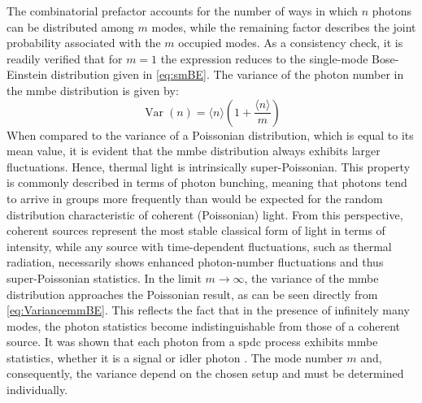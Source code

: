The combinatorial prefactor accounts for the number of ways in which $n$ photons can be distributed among $m$ modes, while the remaining factor describes the joint probability associated with the $m$ occupied modes. As a consistency check, it is readily verified that for $m=1$ the expression reduces to the single-mode Bose-Einstein distribution given in \autoref{eq:smBE}.  \newline
The variance of the photon number in the \acrshort{mmbe} distribution is given by:
\begin{equation}
	\operatorname{Var}(n) = \langle n\rangle\left(1+\frac{\langle n\rangle}{m}\right)
	\label{eq:VariancemmBE}
\end{equation}
When compared to the variance of a Poissonian distribution, which is equal to its mean value, it is evident that the \acrshort{mmbe} distribution always exhibits larger fluctuations. Hence, thermal light is intrinsically super-Poissonian. This property is commonly described in terms of photon bunching, meaning that photons tend to arrive in groups more frequently than would be expected for the random distribution characteristic of coherent (Poissonian) light. \newline
From this perspective, coherent sources represent the most stable classical form of light in terms of intensity, while any source with time-dependent fluctuations, such as thermal radiation, necessarily shows enhanced photon-number fluctuations and thus super-Poissonian statistics. \newline
In the limit $m \to \infty$, the variance of the \acrshort{mmbe} distribution approaches the Poissonian result, as can be seen directly from \autoref{eq:VariancemmBE}. This reflects the fact that in the presence of infinitely many modes, the photon statistics become indistinguishable from those of a coherent source. \newline
It was shown that each photon from a \acrshort{spdc} process exhibits \acrshort{mmbe} statistics, whether it is a signal or idler photon \cite{kimPhotoncountingStatisticsbasedSupport2022}. The mode number $m$ and, consequently, the variance depend on the chosen setup and must be determined individually.


